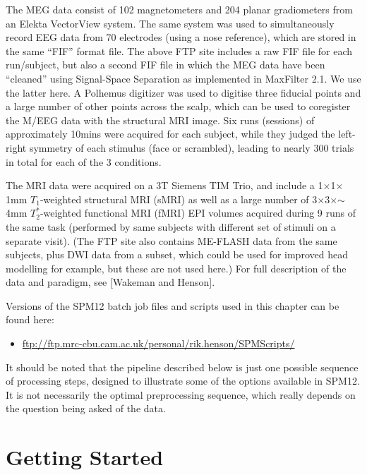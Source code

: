 The MEG data consist of 102 magnetometers and 204 planar gradiometers from an Elekta VectorView system. The same system was used to simultaneously record EEG data from 70 electrodes (using a nose reference), which are stored in the same ``FIF'' format file. The above FTP site includes a raw FIF file for each run/subject, but also a second FIF file in which the MEG data have been ``cleaned'' using Signal-Space Separation as implemented in MaxFilter 2.1. We use the latter here. A Polhemus digitizer was used to digitise three fiducial points and a large number of other points across the scalp, which can be used to coregister the M/EEG data with the structural MRI image. Six runs (sessions) of approximately 10mins were acquired for each subject, while they judged the left-right symmetry of each stimulus (face or scrambled), leading to nearly 300 trials in total for each of the 3 conditions.

The MRI data were acquired on a 3T Siemens TIM Trio, and include a 1\(\times\)1\(\times\)1mm \(T_1\)-weighted structural MRI (sMRI) as well as a large number of 3\(\times\)3\(\times\)\(\sim\)4mm \(T^*_2\)-weighted functional MRI (fMRI) EPI volumes acquired during 9 runs of the same task (performed by same subjects with different set of stimuli on a separate visit). (The FTP site also contains ME-FLASH data from the same subjects, plus DWI data from a subset, which could be used for improved head modelling for example, but these are not used here.) For full description of the data and paradigm, see [Wakeman and Henson].

Versions of the SPM12 batch job files and scripts used in this chapter can be found here:

\begin{itemize}
	\item[] \url{ftp://ftp.mrc-cbu.cam.ac.uk/personal/rik.henson/SPMScripts/}
\end{itemize}

It should be noted that the pipeline described below is just one possible sequence of processing steps, designed to illustrate some of the options available in SPM12. It is not necessarily the optimal preprocessing sequence, which really depends on the question being asked of the data.

\section{Getting Started}

